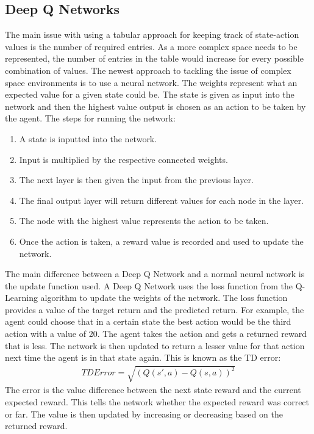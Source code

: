 \subsection{Deep Q Networks}
The main issue with using a tabular approach for keeping track of state-action values is the number of required entries. As a more complex space needs to be represented, the number of entries in the table would increase for every possible combination of values. The newest approach to tackling the issue of complex space environments is to use a neural network. The weights represent what an expected value for a given state could be. The state is given as input into the network and then the highest value output is chosen as an action to be taken by the agent. The steps for running the network:
\begin{enumerate}
\item A state is inputted into the network.
\item Input is multiplied by the respective connected weights.
\item The next layer is then given the input from the previous layer.
\item The final output layer will return different values for each node in the layer.
\item The node with the highest value represents the action to be taken.
\item Once the action is taken, a reward value is recorded and used to update the network.
\end{enumerate}
The main difference between a Deep Q Network and a normal neural network is the update function used. 
A Deep Q Network uses the loss function from the Q-Learning algorithm to update the weights of the network. The loss function provides a value of the target return and the predicted return. For example, the agent could choose that in a certain state the best action would be the third action with a value of 20. The agent takes the action and gets a returned reward that is less. The network is then updated to return a lesser value for that action next time the agent is in that state again. This is known as the TD error:
\begin{align}
TD Error = \sqrt{(Q(s',a) - Q(s,a))^{2}}
\end{align}
The error is the value difference between the next state reward and the current expected reward. This tells the network whether the expected reward was correct or far. The value is then updated by increasing or decreasing based on the returned reward. \cite{pandey2010reinforcement}


